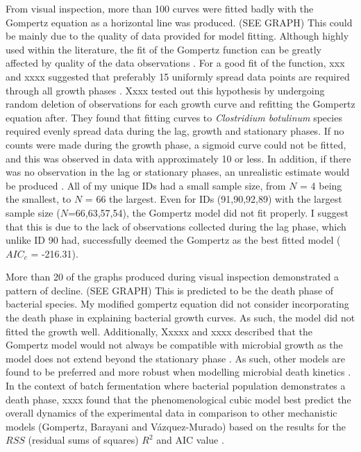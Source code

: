 \documentclass[11pt]{article}
\begin{document}
From visual inspection, more than 100 curves were fitted badly with the Gompertz equation as a horizontal line was produced. (SEE GRAPH) This could 
be mainly due to the quality of data provided for model fitting. Although highly used within the literature, the fit of the Gompertz function can be
greatly affected by quality of the data observations \cite{labuza_growth_1993}. For a good fit of the function, xxx and xxxx suggested that preferably 15 uniformly spread
data points are required through all growth phases \cite{labuza_growth_1993,salazar_primary_2021}. Xxxx tested out this hypothesis by undergoing random deletion of observations
for each growth curve and refitting the Gompertz equation after. They found that fitting curves to \emph{Clostridium botulinum} species required evenly spread data
during the lag, growth and stationary phases. If no counts were made during the growth phase, a sigmoid curve could not be fitted, and this was
observed in data with approximately 10 or less. In addition, if there was no observation in the lag or stationary phases, an unrealistic 
estimate would be produced \cite{murphy_development_1996}. All of my unique IDs had a small sample size, from $N$ = 4 being the smallest, to $N$ = 66 the largest. Even for IDs
(91,90,92,89) with the largest sample size ($N$=66,63,57,54), the Gompertz model did not fit properly. I suggest that this is due to the lack
of observations collected during the lag phase, which unlike ID 90 had, successfully deemed the Gompertz as the best fitted model ($AIC_{c}$ = -216.31). 

More than 20 of the graphs produced during visual inspection demonstrated a pattern of decline. (SEE GRAPH) This is predicted to be the death phase of 
bacterial species. My modified gompertz equation did not consider incorporating the death phase in explaining bacterial growth curves. As such, 
the model did not fitted the growth well. Additionally, Xxxxx and xxxx described that the Gompertz model would not always be compatible
with microbial growth as the model does not extend beyond the stationary phase \cite{gibson_predicting_1988,xiong_comparison_1999}. As such, other models are found to be preferred and more
robust when modelling microbial death kinetics \cite{xiong_comparison_1999}. In the context of batch fermentation where bacterial population demonstrates a death phase,
xxxx found that the phenomenological cubic model best predict the overall dynamics of the experimental data in comparison to other mechanistic
models (Gompertz, Barayani and Vázquez-Murado) based on the results for the $RSS$ (residual sums of squares) $R^{2}$ and AIC value \cite{salazar_primary_2021}.
\end{document}
